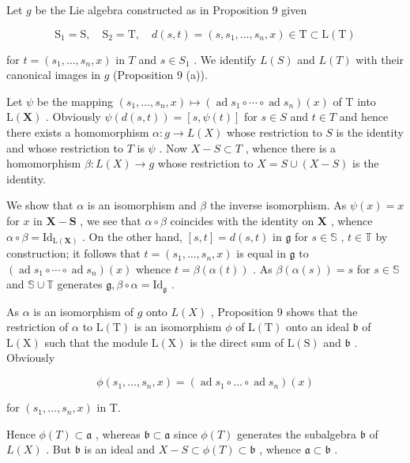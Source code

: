 Let \(g\) be the Lie algebra constructed as in Proposition 9 given

\[
\mathrm{S} _ {1} = \mathrm{S}, \quad \mathrm{S} _ {2} = \mathrm{T}, \quad d (s, t) = (s, s _ {1}, \dots , s _ {n}, x) \in \mathrm{T} \subset \mathrm{L} (\mathrm{T})
\]

for \(t = (s_1, \ldots, s_n, x)\) in \(T\) and \(s \in S_1\) . We identify \(L(S)\) and \(L(T)\) with their canonical images in \(g\) (Proposition 9 (a)).

Let \(\psi\) be the mapping \((s_1, \ldots, s_n, x) \mapsto (\operatorname{ad} s_1 \circ \cdots \circ \operatorname{ad} s_n)(x)\) of T into \(\mathrm{L}(\mathbf{X})\) . Obviously \(\psi(d(s, t)) = [s, \psi(t)]\) for \(s \in S\) and \(t \in T\) and hence there exists a homomorphism \(\alpha: g \to L(X)\) whose restriction to \(S\) is the identity and whose restriction to \(T\) is \(\psi\) . Now \(X - S \subset T\) , whence there is a homomorphism \(\beta: L(X) \to g\) whose restriction to \(X = S \cup (X - S)\) is the identity.

We show that \(\alpha\) is an isomorphism and \(\beta\) the inverse isomorphism. As \(\psi(x) = x\) for \(x\) in \(\mathbf{X} - \mathbf{S}\) , we see that \(\alpha \circ \beta\) coincides with the identity on \(\mathbf{X}\) , whence \(\alpha \circ \beta = \mathrm{Id}_{\mathrm{L}(\mathbf{X})}\) . On the other hand, \([s, t] = d(s, t)\) in \(\mathfrak{g}\) for \(s \in \mathbb{S}\) , \(t \in \mathbb{T}\) by construction; it follows that \(t = (s_1, \ldots, s_n, x)\) is equal in \(\mathfrak{g}\) to \((\operatorname{ad} s_1 \circ \cdots \circ \operatorname{ad} s_n)(x)\) whence \(t = \beta(\alpha(t))\) . As \(\beta(\alpha(s)) = s\) for \(s \in \mathbb{S}\) and \(\mathbb{S} \cup \mathbb{T}\) generates \(\mathfrak{g}, \beta \circ \alpha = \mathrm{Id}_{\mathfrak{g}}\) .

As \(\alpha\) is an isomorphism of \(g\) onto \(L(X)\) , Proposition 9 shows that the restriction of \(\alpha\) to \(\mathrm{L(T)}\) is an isomorphism \(\phi\) of \(\mathrm{L(T)}\) onto an ideal \(\mathfrak{b}\) of \(\mathrm{L(X)}\) such that the module \(\mathrm{L(X)}\) is the direct sum of \(\mathrm{L(S)}\) and \(\mathfrak{b}\) . Obviously

\[
\phi (s _ {1}, \dots , s _ {n}, x) = (\operatorname{ad} s _ {1} \circ \dots \circ \operatorname{ad} s _ {n}) (x)
\]

for \((s_1, \ldots, s_n, x)\) in T.

Hence \(\phi(T) \subset \mathfrak{a}\) , whereas \(\mathfrak{b} \subset \mathfrak{a}\) since \(\phi(T)\) generates the subalgebra \(\mathfrak{b}\) of \(L(X)\) . But \(\mathfrak{b}\) is an ideal and \(X - S \subset \phi(T) \subset \mathfrak{b}\) , whence \(\mathfrak{a} \subset \mathfrak{b}\) .

